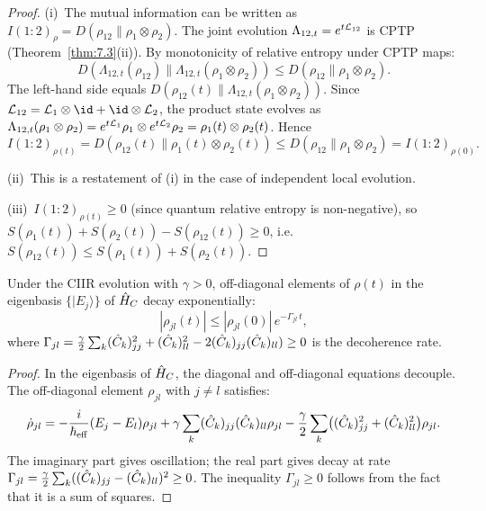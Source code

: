\begin{proof}
(i)~The mutual information can be written as
$I(1:2)_\rho = D(\rho_{12}\|\rho_1 \otimes \rho_2)$.  The joint
evolution $\Lambda_{12,t} = e^{t\mathcal{L}_{12}}$ is CPTP
(Theorem~\ref{thm:7.3}(ii)).  By monotonicity of relative entropy
under CPTP maps:
\[
  D(\Lambda_{12,t}(\rho_{12}) \|
  \Lambda_{12,t}(\rho_1 \otimes \rho_2))
  \leq D(\rho_{12} \| \rho_1 \otimes \rho_2).
\]
The left-hand side equals
$D(\rho_{12}(t) \| \Lambda_{12,t}(\rho_1 \otimes \rho_2))$.
Since $\CL_{12} = \CL_1 \otimes \id + \id \otimes \CL_2$, the
product state evolves as $\Lambda_{12,t}(\rho_1 \otimes \rho_2) =
e^{t\mathcal{L}_1}\rho_1 \otimes e^{t\mathcal{L}_2}\rho_2 = \rho_1(t) \otimes
\rho_2(t)$.  Hence
\[
  I(1:2)_{\rho(t)}
  = D(\rho_{12}(t) \| \rho_1(t) \otimes \rho_2(t))
  \leq D(\rho_{12} \| \rho_1 \otimes \rho_2)
  = I(1:2)_{\rho(0)}.
\]

(ii)~This is a restatement of (i) in the case of independent
local evolution.

(iii)~$I(1:2)_{\rho(t)} \geq 0$ (since quantum relative entropy is
non-negative), so $S(\rho_1(t)) + S(\rho_2(t)) - S(\rho_{12}(t))
\geq 0$, i.e.\ $S(\rho_{12}(t)) \leq S(\rho_1(t)) + S(\rho_2(t))$.
\end{proof}

\begin{proposition}
\label{prop:7.2}
Under the CIIR evolution with $\gamma > 0$, off-diagonal elements
of $\rho(t)$ in the eigenbasis $\{|E_j\rangle\}$ of $\hat{H}_C$ decay
exponentially:
\[
  |\rho_{jl}(t)| \leq |\rho_{jl}(0)|\,
  e^{-\Gamma_{jl}\,t},
\]
where $\Gamma_{jl} = \frac{\gamma}{2}\sum_k
(\hat{C}_k)_{jj}^2 + (\hat{C}_k)_{ll}^2 -
2(\hat{C}_k)_{jj}(\hat{C}_k)_{ll}) \geq 0$ is the decoherence rate.
\end{proposition}

\begin{proof}
In the eigenbasis of $\hat{H}_C$, the diagonal and off-diagonal
equations decouple.  The off-diagonal element $\rho_{jl}$ with
$j \neq l$ satisfies:
\[
  \dot\rho_{jl} = -\frac{i}{\hbar_{\mathrm{eff}}}(E_j - E_l)\rho_{jl}
  + \gamma\sum_k (\hat{C}_k)_{jj}(\hat{C}_k)_{ll}\rho_{jl}
  - \frac{\gamma}{2}\sum_k \bigl((\hat{C}_k)_{jj}^2 +
  (\hat{C}_k)_{ll}^2\bigr)\rho_{jl}.
\]
The imaginary part gives oscillation; the real part gives decay at rate
$\Gamma_{jl} = \frac{\gamma}{2}\sum_k
((\hat{C}_k)_{jj} - (\hat{C}_k)_{ll})^2 \geq 0$.
The inequality $\Gamma_{jl} \geq 0$ follows from the fact that it is
a sum of squares.
\end{proof}

